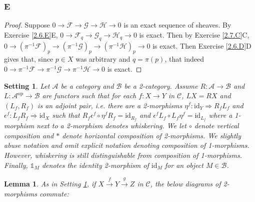 \documentclass{article}
\newcommand{\id}{\mathrm{id}}
\newcommand{\fA}{\mathscr{A}}
\newcommand{\fB}{\mathscr{B}}
\newcommand{\fC}{\mathscr{C}}
\newcommand{\fF}{\mathscr{F}}
\newcommand{\fG}{\mathscr{G}}
\newcommand{\fH}{\mathscr{H}}
\DeclareMathOperator{\op}{op}
\newcommand{\altid}{\mathds{1}}
\newtheorem{lemma}[theorem]{Lemma}
\newtheorem{setting}{Setting}
\begin{document}
\subsubsection{E}\label{2.7.E}
\begin{proof}
    Suppose $0\to \fF \to \fG \to \fH \to 0$ is an exact sequence of sheaves. By Exercise \ref{2.6.E}E, $0\to \fF_q \to \fG_q\to \fH_q\to 0$ is exact. Then by Exercise \ref{2.7.C}C, $0\to (\pi^{-1} \fF)_p \to (\pi^{-1}\fG)_p\to (\pi^{-1} \fH)_p \to 0$ is exact. Then Exercise \ref{2.6.D}D gives that, since $p\in X$ was arbitrary and $q=\pi(p)$, that indeed $0\to \pi^{-1} \fF\to \pi^{-1} \fG \to \pi^{-1} \fH \to 0$ is exact.
\end{proof}
\begin{setting}\label{set:Adjoint functors into 2-category}
    Let $\fA$ be a category and $\fB$ be a 2-category. Assume $R:\fA \to \fB$ and $L:\fA^{\op} \to \fB$ are functors such that for each $f:X\to Y$ in $\fC$, $LX=RX$ and $(L_f, R_f)$ is an adjoint pair, i.e. there are a 2-morphisms $\eta^f:\id_Y \Rightarrow R_fL_f$ and $\epsilon^f:L_fR_f \Rightarrow \id_X$ such that $R_f \epsilon^f \circ \eta^f R_f = \id_{R_f}$ and $\epsilon^f L_f \circ L_f \eta^f = \id_{L_f}$ where a 1-morphism next to a 2-morphism denotes whiskering. We let $\circ$ denote vertical composition and $*$ denote horizontal composition of 2-morphisms. We slightly abuse notation and omit explicit notation denoting composition of 1-morphisms. However, whiskering is still distinguishable from composition of 1-morphisms. Finally, $\altid_M$ denotes the identity 2-morphism of $\id_M$ for an object $M\in \fB$.
\end{setting}
\begin{lemma}\label{lem:unit counit commute}
    As in Setting \ref{set:Adjoint functors into 2-category}, if $X\xrightarrow{f} Y \xrightarrow{g} Z$ in $\fC$, the below diagrams of 2-morphisms commute:
    \begin{center}
    \end{center}
    \begin{center}
    \end{center}
    \end{lemma}
\end{document}
